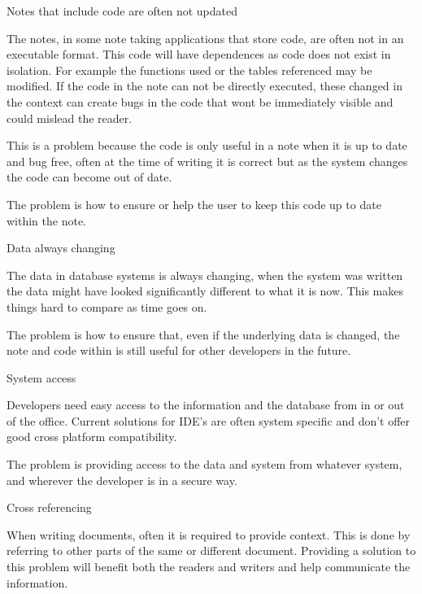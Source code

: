 \begin{problem}{Notes that include code are often not
updated}

The notes, in some note taking applications that store code, are often not in an
executable format. This code will have dependences as code does not exist in isolation. For example the functions used or the tables referenced may be modified. If the code in the note can not be directly executed, these changed in the context can create bugs in the code that wont be immediately visible and could mislead the reader.

This is a problem because the code is only useful in a note when it is
up to date and bug free, often at the time of writing it is correct but
as the system changes the code can become out of date.

The problem is how to ensure or help the user to keep this code up to
date within the note.

\end{problem}

\begin{problem}{Data always changing}

The data in database systems is always changing, when the system was
written the data might have looked significantly different to what it is
now. This makes things hard to compare as time goes on.

The problem is how to ensure that, even if the underlying data is
changed, the note and code within is still useful for other developers
in the future.

\end{problem}

\begin{problem}{System access}

Developers need easy access to the information and the database from in or out of the office. Current solutions for IDE's are often system specific and
don't offer good cross platform compatibility.

The problem is providing access to the data and system from whatever
system, and wherever the developer is in a secure way.
\end{problem}

\begin{problem}{Cross referencing}

When writing documents, often it is required to provide context. This is done by referring to other parts of the same or different document. Providing a solution to this problem will benefit both the readers and writers and help communicate the information.

\end{problem}

